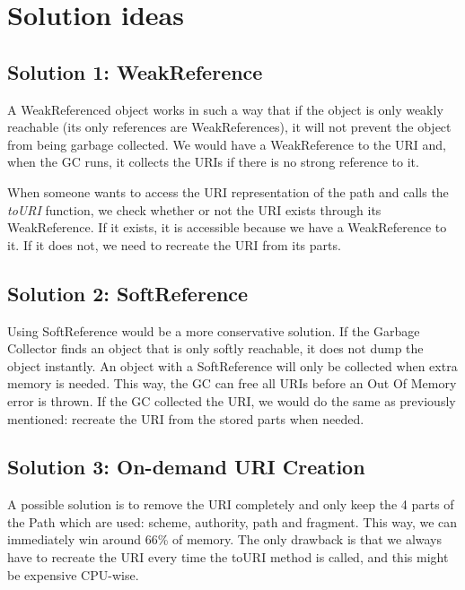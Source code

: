 \section{Solution ideas}
\subsection{Solution 1: WeakReference}
A WeakReferenced object works in such a way that if the object is only weakly reachable (its only references are WeakReferences), it will not prevent the object from being garbage collected. We would have a WeakReference to the URI and, when the GC runs, it collects the URIs if there is no strong reference to it. 

When someone wants to access the URI representation of the path and calls the \textit{toURI} function, we check whether or not the URI exists through its WeakReference. If it exists, it is accessible because we have a WeakReference to it. If it does not, we need to recreate the URI from its parts. 

\subsection{Solution 2: SoftReference}
Using SoftReference would be a more conservative solution. If the Garbage Collector finds an object that is only softly reachable, it does not dump the object instantly. An object with a SoftReference will only be collected when extra memory is needed. This way, the GC can free all URIs before an Out Of Memory error is thrown. If the GC collected the URI, we would do the same as previously mentioned: recreate the URI from the stored parts when needed. 

\subsection{Solution 3: On-demand URI Creation}
A possible solution is to remove the URI completely and only keep the 4 parts of the Path which are used: scheme, authority, path and fragment. This way, we can immediately win around 66\% of memory. The only drawback is that we always have to recreate the URI every time the toURI method is called, and this might be expensive CPU-wise.

